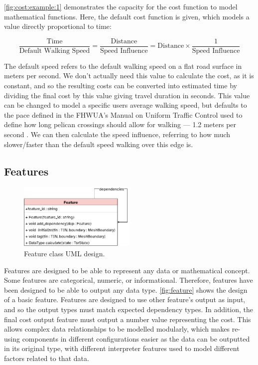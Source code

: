 \documentclass[12pt]{article}
\begin{document}
\autoref{fig:cost:example:1} demonstrates the capacity for the cost function to model mathematical functions. Here, the default cost function is given, which models a value directly proportional to time:

\[\frac{\text{Time}}{\text{Default Walking Speed}} = \frac{\text{Distance}}{\text{Speed Influence}} = \text{Distance} \times \frac{1}{\text{Speed Influence}}\]

The default speed refers to the default walking speed on a flat road surface in meters per second. We don't actually need this value to calculate the cost, as it is constant, and so the resulting costs can be converted into estimated time by dividing the final cost by this value giving travel duration in seconds. This value can be changed to model a specific users average walking speed, but defaults to the pace defined in the FHWUA's Manual on Uniform Traffic Control used to define how long pelican crossings should allow for walking --- 1.2 meters per second \autocite{united1978manual}. We can then calculate the speed influence, referring to how much slower/faster than the default speed walking over this edge is.

\subsection{Features}

\begin{figure}[H]
  \centering
  \includegraphics[width=0.5\textwidth]{assets/feature.png}
  \caption{Feature class UML design.}\label{fig:feature}
\end{figure}

Features are designed to be able to represent any data or mathematical concept. Some features are categorical, numeric, or informational. Therefore, features have been designed to be able to output any data type. \autoref{fig:feature} shows the design of a basic feature. Features are designed to use other feature's output as input, and so the output types must match expected dependency types. In addition, the final cost output feature must output a number value representing the cost. This allows complex data relationships to be modelled modularly, which makes re-using components in different configurations easier as the data can be outputted in its original type, with different interpreter features used to model different factors related to that data.
\end{document}
